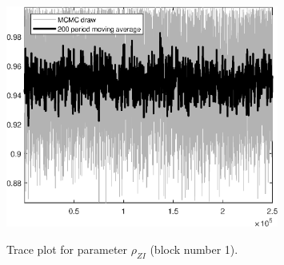 \begin{figure}[H]
\centering
  \includegraphics[width=0.8\textwidth]{BRS_growth_ext_comovement/graphs/TracePlot_rho_ZI_blck_1}\\
    \caption{Trace plot for parameter ${\rho_{ZI}}$ (block number 1).}
\end{figure}
